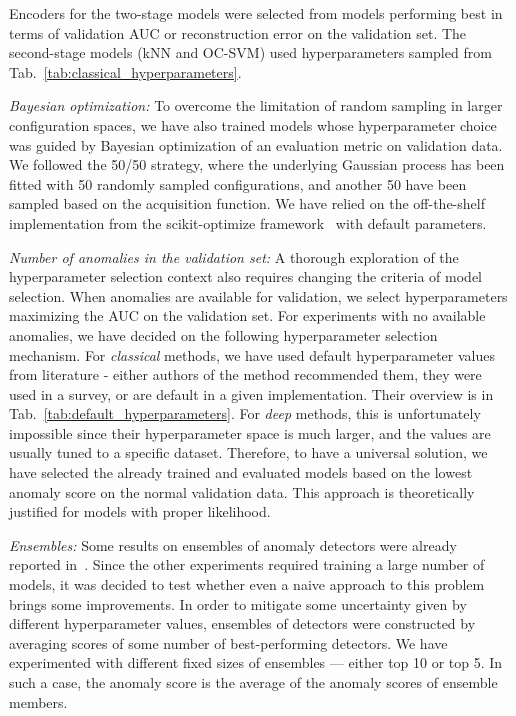 Encoders for the two-stage models were selected from models performing best in terms of validation AUC or reconstruction error on the validation set. The second-stage models (kNN and OC-SVM) used hyperparameters sampled from Tab.~\ref{tab:classical_hyperparameters}. 

\textit{Bayesian optimization:} To overcome the limitation of random sampling in larger configuration spaces, we have also trained models whose hyperparameter choice was guided by Bayesian optimization of an evaluation metric on validation data. We followed the 50/50 strategy, where the underlying Gaussian process has been fitted with 50 randomly sampled configurations, and another 50 have been sampled based on the acquisition function. We have relied on the off-the-shelf implementation from the scikit-optimize framework~\cite{skopt} with default parameters.

\textit{Number of anomalies in the validation set:} A thorough exploration of the hyperparameter selection context also requires changing the criteria of model selection. When anomalies are available for validation, we select hyperparameters maximizing the AUC on the validation set. For experiments with no available anomalies, we have decided on the following hyperparameter selection mechanism. For \textit{classical} methods, we have used default hyperparameter values from literature - either authors of the method recommended them, they were used in a survey, or are default in a given implementation. Their overview is in Tab.~\ref{tab:default_hyperparameters}. For \textit{deep} methods, this is unfortunately impossible since their hyperparameter space is much larger, and the values are usually tuned to a specific dataset. Therefore, to have a universal solution, we have selected the already trained and evaluated models based on the lowest anomaly score on the normal validation data. This approach is theoretically justified for models with proper likelihood. 

\textit{Ensembles:} Some results on ensembles of anomaly detectors were already reported in~\cite{choiWAICWhyGenerative2019, nalisnickDeepGenerativeModels2019}. Since the other experiments required training a large number of models, it was decided to test whether even a naive approach to this problem brings some improvements. In order to mitigate some uncertainty given by different hyperparameter values, ensembles of detectors were constructed by averaging scores of some number of best-performing detectors. We have experimented with different fixed sizes of ensembles --- either top 10 or top 5. In such a case, the anomaly score is the average of the anomaly scores of ensemble members.

